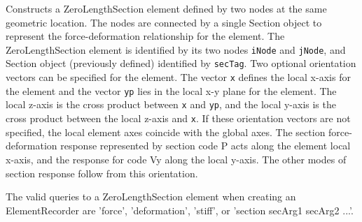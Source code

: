 \documentclass[12pt]{article}
\begin{document}
\noindent Constructs a ZeroLengthSection element defined by two nodes at the
same geometric location. The nodes are connected by a single
Section object to represent the force-deformation
relationship for the element. The ZeroLengthSection element is identified
by its two nodes {\tt iNode} and {\tt jNode}, and Section object
(previously defined) identified by {\tt secTag}. Two optional orientation
vectors can be
specified for the element. The vector {\tt x} defines the local x-axis for
the element and the vector {\tt yp} lies in the local x-y plane for the
element. The local z-axis is the cross product between {\tt x} and {\tt yp},
and the local y-axis is the cross product between the local z-axis and {\tt x}.
If these orientation vectors are not specified, the local element axes
coincide with the global axes. The section force-deformation response
represented by section code P acts along the element local x-axis, and
the response for code Vy along the local y-axis. The other modes of
section response follow from this orientation.

The valid queries to a ZeroLengthSection element when creating an
ElementRecorder are 'force', 'deformation', 'stiff', or 'section
secArg1 secArg2 ...'.

%
%
\end{document}
